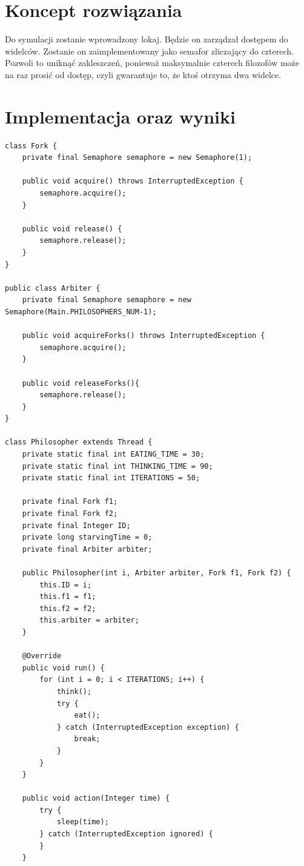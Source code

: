 \documentclass[12pt]{article}
\begin{document}
\section{Koncept rozwiązania}
Do symulacji zostanie wprowadzony lokaj. Będzie on zarządzał dostępem do widelców. Zostanie on zaimplementowany jako semafor zliczający do czterech. Pozwoli to uniknąć zakleszczeń, ponieważ maksymalnie czterech filozofów może na raz prosić od dostęp, czyli gwarantuje to, że ktoś otrzyma dwa widelce.

\section{Implementacja oraz wyniki}

\begin{verbatim}
class Fork {
    private final Semaphore semaphore = new Semaphore(1);

    public void acquire() throws InterruptedException {
        semaphore.acquire();
    }

    public void release() {
        semaphore.release();
    }
}

public class Arbiter {
    private final Semaphore semaphore = new Semaphore(Main.PHILOSOPHERS_NUM-1);

    public void acquireForks() throws InterruptedException {
        semaphore.acquire();
    }

    public void releaseForks(){
        semaphore.release();
    }
}

class Philosopher extends Thread {
    private static final int EATING_TIME = 30;
    private static final int THINKING_TIME = 90;
    private static final int ITERATIONS = 50;

    private final Fork f1;
    private final Fork f2;
    private final Integer ID;
    private long starvingTime = 0;
    private final Arbiter arbiter;

    public Philosopher(int i, Arbiter arbiter, Fork f1, Fork f2) {
        this.ID = i;
        this.f1 = f1;
        this.f2 = f2;
        this.arbiter = arbiter;
    }

    @Override
    public void run() {
        for (int i = 0; i < ITERATIONS; i++) {
            think();
            try {
                eat();
            } catch (InterruptedException exception) {
                break;
            }
        }
    }

    public void action(Integer time) {
        try {
            sleep(time);
        } catch (InterruptedException ignored) {
        }
    }


\end{verbatim}
\end{document}
